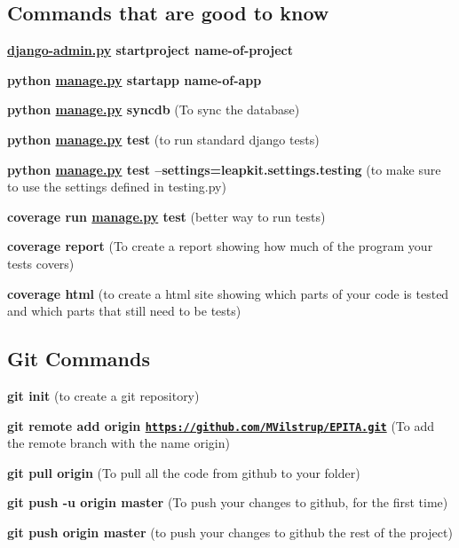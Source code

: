 \subsection*{Commands that are good to know }


\begin{DoxyEnumerate}
\item {\bfseries \hyperlink{django-admin_8py}{django-\/admin.\-py} startproject name-\/of-\/project}
\item {\bfseries python \hyperlink{manage_8py}{manage.\-py} startapp name-\/of-\/app}
\item {\bfseries python \hyperlink{manage_8py}{manage.\-py} syncdb} (To sync the database)
\item {\bfseries python \hyperlink{manage_8py}{manage.\-py} test} (to run standard django tests)
\item {\bfseries python \hyperlink{manage_8py}{manage.\-py} test --settings=leapkit.\-settings.\-testing} (to make sure to use the settings defined in testing.\-py)
\end{DoxyEnumerate}
\begin{DoxyEnumerate}
\item {\bfseries coverage run \hyperlink{manage_8py}{manage.\-py} test} (better way to run tests)
\item {\bfseries coverage report} (To create a report showing how much of the program your tests covers)
\item {\bfseries coverage html} (to create a html site showing which parts of your code is tested and which parts that still need to be tests)
\end{DoxyEnumerate}

\subsection*{Git Commands}


\begin{DoxyEnumerate}
\item {\bfseries git init} (to create a git repository)
\item {\bfseries git remote add origin \href{https://github.com/MVilstrup/EPITA.git}{\tt https\-://github.\-com/\-M\-Vilstrup/\-E\-P\-I\-T\-A.\-git}} (To add the remote branch with the name origin)
\item {\bfseries git pull origin} (To pull all the code from github to your folder)
\item {\bfseries git push -\/u origin master} (To push your changes to github, for the first time)
\item {\bfseries git push origin master} (to push your changes to github the rest of the project) 
\end{DoxyEnumerate}